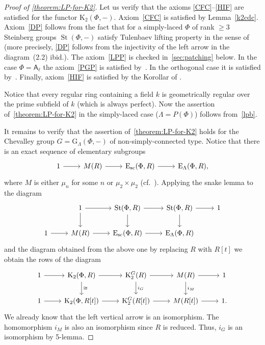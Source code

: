\documentclass[oneside, 11pt]{amsart}
\numberwithin{equation}{section}
\newcommand{\K}{{\mathrm{K}}}
\newcommand{\St}{\mathop{\mathrm{St}}\nolimits}
\newcommand{\E}{\mathrm{E}}
\theoremstyle{definition}
\theoremstyle{definition}
\theoremstyle{remark}
\newcommand{\rA}{\mathsf{A}}
\begin{document}
\begin{proof}[Proof of \cref{theorem:LP-for-K2}]
Let us verify that the axioms \ref{CFC}--\ref{HIF} are satisfied for the functor $\K_2(\Phi, -)$. Axiom~\ref{CFC} is satisfied by Lemma~\ref{k2cdc}. Axiom~\ref{DP} follows from the fact that for a simply-laced $\Phi$ of rank $\geq 3$ Steinberg groups $\St(\Phi, -)$ satisfy Tulenbaev lifting property in the sense of~\cite[Definition~2.1]{LS17} (more precisely, \ref{DP} follows from the injectivity of the left arrow in the diagram~(2.2) ibid.).
The axiom~\ref{LPP} is checked in~\cref{sec:patching} below.
In the case $\Phi = \rA_\ell$ the axiom~\ref{PGP} is satisfied by~\cite[Theorem~5.1]{Tu83}. In the orthogonal case it is satisfied by~\cite[Theorem~1]{LS20}. Finally, axiom~\ref{HIF} is satisfied by the Korollar of \cite[Satz~1]{Re75}.

Notice that every regular ring containing a field $k$ is geometrically regular over the prime subfield of $k$ (which is always perfect). Now the assertion of~\cref{theorem:LP-for-K2} in the simply-laced case ($\Lambda = P(\Phi)$) follows from~\cref{lpb}.

It remains to verify that the assertion of~\cref{theorem:LP-for-K2} holds for the Chevalley group $G = \mathrm{G}_\Lambda(\Phi, -)$ of non-simply-connected type. Notice that there is an exact sequence of elementary subgroups
\begin{equation} \label{eq:E-seq} \begin{tikzcd} 1 \ar[r] & M(R) \ar[r] & \E_\mathrm{sc}(\Phi, R) \ar[r] & \E_\Lambda(\Phi, R), \end{tikzcd} \end{equation}
where $M$ is either $\mu_n$ for some $n$ or $\mu_2\times \mu_2$ (cf.~\cite[\S~3]{St67}).
Applying the snake lemma to the diagram
$$
\begin{tikzcd} 
  &  1\ar[r]\ar[d]  & \mathrm{St}(\Phi, R)   \ar{d} \ar[r]  & \mathrm{St}(\Phi, R) \ar{d} \ar[r]  & 1 \\
      1  \ar[r] & M(R)\ar[r] & \E_\mathrm{sc}(\Phi, R) \ar[r] &  \E_\Lambda(\Phi, R) &
    \end{tikzcd}
$$
and the diagram obtained from the above one by replacing $R$ with $R[t]$ we obtain the rows of the diagram
\begin{equation}\label{eq:snake-A1} \begin{tikzcd} 
      1  \ar[r] & \K_2(\Phi, R)   \ar{d}{\cong} \ar[r]  & \K_2^G(R) \ar{d}{i_G} \ar[r] & M(R) \ar[r] \ar{d}{i_M} & 1 \\
      1  \ar[r] & \K_2(\Phi, R[t])\ar[r] & \K_2^G(R[t]) \ar[r] & M(R[t]) \ar[r] & 1.
    \end{tikzcd} \end{equation}
We already know that the left vertical arrow is an isomorphism. The homomorphism $i_M$ is also an isomorphism since $R$ is reduced. Thus, $i_G$ is an isomorphism by 5-lemma.
\end{proof}
\end{document}
